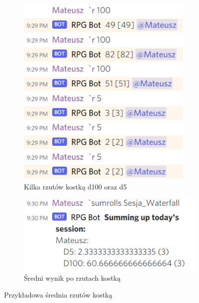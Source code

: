 \documentclass[shortabstract,inz]{iithesis}
\begin{document}
			\begin{figure}[!h]
				\centering
				\begin{subfigure}[b]{.49\textwidth}
					\centering
					\includegraphics[width=0.93\textwidth]{rollExample}
					\caption{Kilka rzutów kostką d100 oraz d5}
				\end{subfigure}
				\hfill
				\begin{subfigure}[b]{.49\textwidth}
					\centering
					\includegraphics[width=1\textwidth]{rollsResult}
					\caption{Średni wynik po rzutach kostką}
				\end{subfigure}
				\caption{Przykładowa średnia rzutów kostką}
				\label{rollResult}
			\end{figure}
	
			
	
\end{document}
